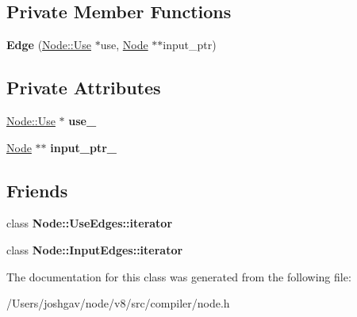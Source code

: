 \subsection*{Private Member Functions}
\begin{DoxyCompactItemize}
\item 
{\bfseries Edge} (\hyperlink{structv8_1_1internal_1_1compiler_1_1_node_1_1_use}{Node\+::\+Use} $\ast$use, \hyperlink{classv8_1_1internal_1_1compiler_1_1_node}{Node} $\ast$$\ast$input\+\_\+ptr)\hypertarget{classv8_1_1internal_1_1compiler_1_1_edge_a80c064f5555678f2026f186f10921964}{}\label{classv8_1_1internal_1_1compiler_1_1_edge_a80c064f5555678f2026f186f10921964}

\end{DoxyCompactItemize}
\subsection*{Private Attributes}
\begin{DoxyCompactItemize}
\item 
\hyperlink{structv8_1_1internal_1_1compiler_1_1_node_1_1_use}{Node\+::\+Use} $\ast$ {\bfseries use\+\_\+}\hypertarget{classv8_1_1internal_1_1compiler_1_1_edge_ac9fd668da42aa70a5b23791803b0ef9d}{}\label{classv8_1_1internal_1_1compiler_1_1_edge_ac9fd668da42aa70a5b23791803b0ef9d}

\item 
\hyperlink{classv8_1_1internal_1_1compiler_1_1_node}{Node} $\ast$$\ast$ {\bfseries input\+\_\+ptr\+\_\+}\hypertarget{classv8_1_1internal_1_1compiler_1_1_edge_ab50192b13377fa2ca08a5a43d8ad7b66}{}\label{classv8_1_1internal_1_1compiler_1_1_edge_ab50192b13377fa2ca08a5a43d8ad7b66}

\end{DoxyCompactItemize}
\subsection*{Friends}
\begin{DoxyCompactItemize}
\item 
class {\bfseries Node\+::\+Use\+Edges\+::iterator}\hypertarget{classv8_1_1internal_1_1compiler_1_1_edge_ac68d910757e19ba0805380bdb57e60fb}{}\label{classv8_1_1internal_1_1compiler_1_1_edge_ac68d910757e19ba0805380bdb57e60fb}

\item 
class {\bfseries Node\+::\+Input\+Edges\+::iterator}\hypertarget{classv8_1_1internal_1_1compiler_1_1_edge_a015a5c14bdeb658aa095eca850e1c6aa}{}\label{classv8_1_1internal_1_1compiler_1_1_edge_a015a5c14bdeb658aa095eca850e1c6aa}

\end{DoxyCompactItemize}


The documentation for this class was generated from the following file\+:\begin{DoxyCompactItemize}
\item 
/\+Users/joshgav/node/v8/src/compiler/node.\+h\end{DoxyCompactItemize}
